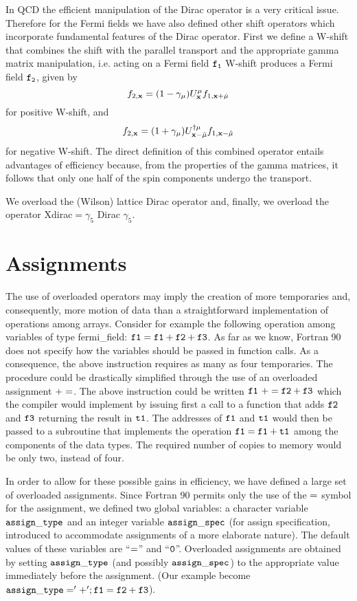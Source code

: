 In QCD the efficient manipulation of the Dirac operator
is a very critical issue. Therefore for the Fermi fields we have 
also defined other shift operators which incorporate fundamental 
features of the Dirac operator.
First we define a W-shift that combines the shift with 
the parallel transport and the appropriate
gamma matrix manipulation, i.e.
acting on a Fermi field $\tt f_1$ W-shift produces a
Fermi field $\tt f_2$, given by 
%
\begin{equation}
f_{2,{\bf x}}= (1-\gamma_{\mu})U^{\mu}_{{\bf x}} 
f_{1,{\bf x}+\hat\mu}
\end{equation}
%
for positive W-shift, and
%
\begin{equation}
f_{2,{\bf x}}= (1+\gamma_{\mu})
U^{\dagger \mu}_{{\bf x}-\hat\mu} f_{1,{\bf x}-\hat\mu}
\end{equation}
%
for negative W-shift.
The direct definition of this combined operator entails 
advantages of efficiency because, from the properties of the gamma
matrices, it follows that only one half of the spin components 
undergo the transport.

We overload the (Wilson) lattice Dirac operator
and, finally, we overload the operator
Xdirac$=\gamma_5$ Dirac $\gamma_5$.


\section{Assignments}

The use of overloaded operators may imply the creation of more 
temporaries and, consequently, more motion of data than a 
straightforward implementation of operations among arrays.  
Consider for example the following operation among variables 
of type fermi\_field: $\tt f1=f1+f2+f3 $.
As far as we know, Fortran 90 does not specify how the 
variables should be passed in function calls.
As a consequence, the above instruction requires as many 
as four temporaries.
The procedure could be drastically simplified through the use of
an overloaded assignment $\tt +=$.  
The above instruction could be written $\tt f1~ += f2+f3 $
which the compiler would implement by issuing first a call to 
a function that adds $\tt f2$ and $\tt f3$ returning the result 
in $\tt t1$.  The addresses of $\tt f1$ and $\tt t1$ would then 
be passed to a subroutine that implements the operation 
$\tt f1=f1+t1$ among the components of the data types.  
The required number of copies to memory would be only two, 
instead of four.

In order to allow for these possible gains in efficiency, we 
have defined a large set of overloaded assignments.
Since Fortran 90 permits only the use of the $\tt =$ symbol 
for the assignment, we defined two global variables: a character 
variable $\tt assign\_type$ and an integer variable 
$\tt assign\_spec$ (for assign specification, introduced to 
accommodate assignments of a more elaborate nature).  
The default values of these variables are ``$\tt =$'' and 
``$\tt 0$''.  
Overloaded assignments are obtained by setting 
$\tt assign\_type$ (and possibly $\tt assign\_spec$) to the 
appropriate value immediately before the assignment. 
(Our example become $\tt assign\_type='+'; f1=f2+f3 $).

